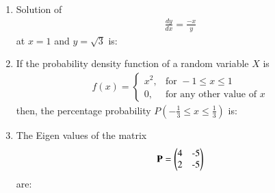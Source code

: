 \documentclass[journal]{IEEEtran}
\begin{document}
\begin{enumerate}
\item Solution of \begin{align} \frac{dy}{dx} = \frac{-x}{y} \end{align}at $x = 1$ and $y = \sqrt{3}$ is: \hfill {}
\begin{enumerate}
\end{enumerate}

\item If the probability density function of a random variable $X$ is  
\begin{align}
f(x) = 
\begin{cases}
x^2, & \text{for } -1 \leq x \leq 1 \\
0, & \text{for any other value of } x
\end{cases}
\end{align}
then, the percentage probability $P\left( -\frac{1}{3} \leq x \leq \frac{1}{3} \right)$ is: \hfill {}
\begin{enumerate}
\end{enumerate}

\item The Eigen values of the matrix \hfill {}
\begin{align}
\mathbf{P} = \myvec{$4$ & $-5$ \\ $2$ & $-5$}
\end{align}
are:
\begin{enumerate}
\end{enumerate}


\end{enumerate}
\end{document}
